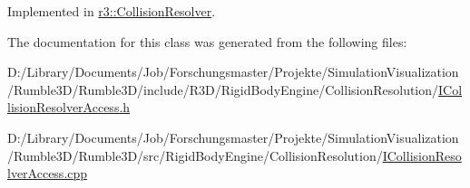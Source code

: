Implemented in \mbox{\hyperlink{classr3_1_1_collision_resolver_a134da5221d60b34c568f7de29c9d0a58}{r3\+::\+Collision\+Resolver}}.



The documentation for this class was generated from the following files\+:\begin{DoxyCompactItemize}
\item 
D\+:/\+Library/\+Documents/\+Job/\+Forschungsmaster/\+Projekte/\+Simulation\+Visualization/\+Rumble3\+D/\+Rumble3\+D/include/\+R3\+D/\+Rigid\+Body\+Engine/\+Collision\+Resolution/\mbox{\hyperlink{_i_collision_resolver_access_8h}{I\+Collision\+Resolver\+Access.\+h}}\item 
D\+:/\+Library/\+Documents/\+Job/\+Forschungsmaster/\+Projekte/\+Simulation\+Visualization/\+Rumble3\+D/\+Rumble3\+D/src/\+Rigid\+Body\+Engine/\+Collision\+Resolution/\mbox{\hyperlink{_i_collision_resolver_access_8cpp}{I\+Collision\+Resolver\+Access.\+cpp}}\end{DoxyCompactItemize}

